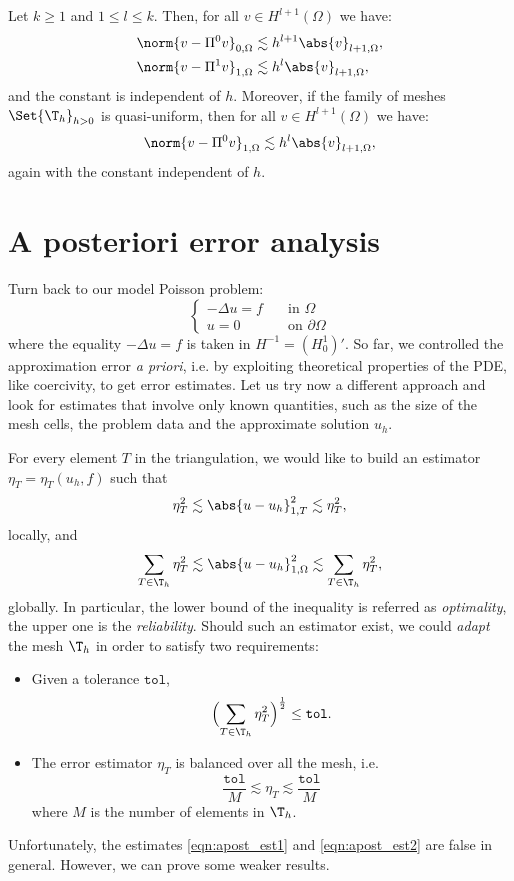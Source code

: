 \begin{lemma}
    Let $k\ge1$ and $1\le l \le k$. Then, for all $v \in H^{l+1}(\Omega)$ we have:
    \begin{align}
        \norm{v - \Pi^0 v}_{0,\Omega} &\lesssim h^{l+1} \abs{v}_{l+1,\Omega}, \\
        \norm{v - \Pi^1 v}_{1,\Omega} &\lesssim h^l \abs{v}_{l+1,\Omega},
    \end{align}
    and the constant is independent of $h$. Moreover, if the family of meshes $\Set{\T_h}_{h>0}$ is quasi-uniform, then for all $v \in H^{l+1}(\Omega)$ we have:
    \[
        \norm{v - \Pi^0 v}_{1,\Omega} \lesssim h^l \abs{v}_{l+1,\Omega},
    \]
    again with the constant independent of $h$.
\end{lemma}


\section{A posteriori error analysis}

Turn back to our model Poisson problem:
\[
\begin{cases}
    -\Delta u = f \quad &\text{in } \Omega \\
    u = 0 \quad &\text{on } \partial\Omega
\end{cases}
\]
where the equality $-\Delta u = f$ is taken in $H^{-1}=(H^1_0)'$. So far, we controlled the approximation error \emph{a priori}, i.e. by exploiting theoretical properties of the PDE, like coercivity, to get error estimates. Let us try now a different approach and look for estimates that involve only known quantities, such as the size of the mesh cells, the problem data and the approximate solution $u_h$.

For every element $T$ in the triangulation, we would like to build an estimator $\eta_T = \eta_T(u_h, f)$ such that
\begin{equation}\label{eqn:apost_est1}
    \eta_T^2 \lesssim \abs{u - u_h}_{1,T}^2 \lesssim \eta_T^2,
\end{equation}
locally, and
\begin{equation}\label{eqn:apost_est2}
\sum_{T \in \T_h} \eta_T^2 \lesssim \abs{u - u_h}_{1,\Omega}^2 \lesssim \sum_{T \in \T_h} \eta_T^2,
\end{equation}
globally. In particular, the lower bound of the inequality is referred as \emph{optimality}, the upper one is the \emph{reliability}.
Should such an estimator exist, we could \emph{adapt} the mesh $\T_h$ in order to satisfy two requirements:
\begin{itemize}
    \item Given a tolerance $\texttt{tol}$,
    \[
    \Bigl( \sum_{T \in \T_h} \eta_T^2 \Bigr)^\frac{1}{2} \le \texttt{tol}.
    \]
    \item The error estimator $\eta_T$ is balanced over all the mesh, i.e.
    \[
    \frac{\texttt{tol}}{M} \lesssim \eta_T \lesssim \frac{\texttt{tol}}{M}
    \]
    where $M$ is the number of elements in $\T_h$.
\end{itemize}
Unfortunately, the estimates \eqref{eqn:apost_est1} and \eqref{eqn:apost_est2} are false in general. However, we can prove some weaker results.

